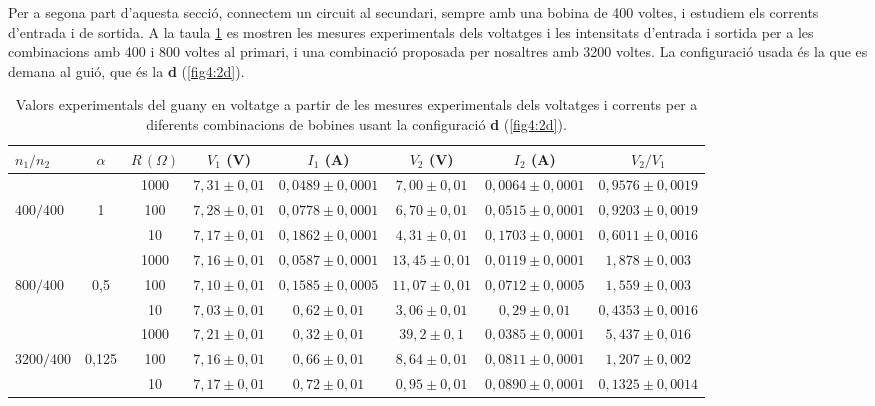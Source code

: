 \documentclass[a4paper,10.5pt]{report}
\begin{document}
Per a segona part d'aquesta secció, connectem un circuit al secundari, sempre amb una bobina de 400 voltes, i estudiem els corrents d’entrada i de sortida. A la taula \ref{tab:4.4} es mostren les mesures experimentals dels voltatges i les intensitats d'entrada i sortida per a les combinacions amb 400 i 800 voltes al primari, i una combinació proposada per nosaltres amb 3200 voltes. La configuració usada és la que es demana al guió, que és la \textbf{d} (\ref{fig4:2d}). 

\begin{table}[H]
	\centering
	\renewcommand{\arraystretch}{1.2}
	\caption{Valors experimentals del guany en voltatge a partir de les mesures experimentals dels voltatges i corrents per a diferents combinacions de bobines usant la configuració \textbf{d} (\ref{fig4:2d}).}
	\begin{tabular}{lccccccc}
		\toprule
		$n_1/n_2$ & $\alpha$ & $R\,(\Omega)$ & $V_1$ (V) & $I_1$ (A) & $V_2$ (V) & $I_2$ (A) & $V_2/V_1$ \\
		\midrule
		& & 1000 & $7{,}31 \pm 0{,}01$ & $0{,}0489 \pm 0{,}0001$ & $7{,}00 \pm 0{,}01$ & $0{,}0064 \pm 0{,}0001$ & $0{,}9576 \pm 0{,}0019$ \\
		$400/400$ & 1 & 100  & $7{,}28 \pm 0{,}01$ & $0{,}0778 \pm 0{,}0001$ & $6{,}70 \pm 0{,}01$ & $0{,}0515 \pm 0{,}0001$ & $0{,}9203 \pm 0{,}0019$  \\
		& & 10   & $7{,}17 \pm 0{,}01$ & $0{,}1862 \pm 0{,}0001$ & $4{,}31 \pm 0{,}01$ & $0{,}1703 \pm 0{,}0001$ & $0{,}6011 \pm 0{,}0016$\\
		\midrule
		& & 1000 & $7{,}16 \pm 0{,}01$ & $0{,}0587 \pm 0{,}0001$ & $13{,}45 \pm 0{,}01$ & $0{,}0119 \pm 0{,}0001$ & $1{,}878 \pm 0{,}003$  \\
		$800/400$ & 0{,}5 & 100  & $7{,}10 \pm 0{,}01$ & $0{,}1585 \pm 0{,}0005$ & $11{,}07 \pm 0{,}01$ & $0{,}0712 \pm 0{,}0005$ & $1{,}559 \pm 0{,}003$ \\
		& & 10   & $7{,}03 \pm 0{,}01$ & $0{,}62 \pm 0{,}01$ & $3{,}06 \pm 0{,}01$ & $0{,}29 \pm 0{,}01$ & $0{,}4353 \pm 0{,}0016$ \\
		\midrule
		& & 1000 & $7{,}21 \pm 0{,}01$ & $0{,}32 \pm 0{,}01$ & $39{,}2 \pm 0{,}1$ & $0{,}0385 \pm 0{,}0001$ & $5{,}437 \pm 0{,}016$ \\
		$3200/400$ & 0{,}125 & 100  & $7{,}16 \pm 0{,}01$ & $0{,}66 \pm 0{,}01$ & $8{,}64 \pm 0{,}01$ & $0{,}0811 \pm 0{,}0001$ & $1{,}207 \pm 0{,}002$  \\
		& & 10   & $7{,}17 \pm 0{,}01$ & $0{,}72 \pm 0{,}01$ & $0{,}95 \pm 0{,}01$ & $0{,}0890 \pm 0{,}0001$ & $0{,}1325 \pm 0{,}0014$ \\
		\bottomrule
	\end{tabular}
	\label{tab:4.4}
\end{table}
\end{document}
